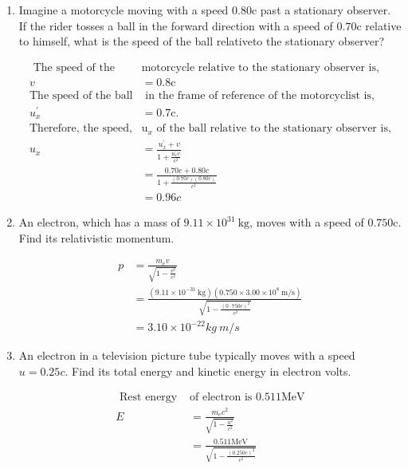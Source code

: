 \begin{enumerate}[ label=\color{ocre}\textbf{\arabic*.}]
	\item Imagine a motorcycle moving with a speed $0.80 \mathrm{c}$ past a stationary observer. If the rider tosses a ball in the forward direction with a speed of $0.70 \mathrm{c}$ relative to himself, what is the speed of the ball relativeto the stationary observer?
	\begin{answer}
		\begin{align*}
		\text{	The speed of the }&\text{motorcycle relative to the stationary observer is,} \\
		v&=0.8 \mathrm{c}\\
		\text{The speed of the ball}&\text{ in the frame of reference of the motorcyclist is,} \\
		 u_{x}^{\prime}&=0.7 \mathrm{c} . \\
		 \text{Therefore, the speed,}&\text{$\mathrm{u}_{x}$ of the ball relative to the stationary observer is,}\\
		u_{x}&=\frac{u_{x}^{\prime}+v}{1+\frac{u_{x}^{\prime} v}{c^{2}}}\\
		&=\frac{0.70 c+0.80 c}{1+\frac{(0.70  c)(0.80 c)}{c^{2}}}\\
		&=0.96 c
		\end{align*}
	\end{answer}
	\item An electron, which has a mass of $9.11 \times 10^{31} \mathrm{~kg}$, moves with a speed of $0.750 \mathrm{c}$. Find its relativistic momentum.
	\begin{answer}
		\begin{align*}
		p&=\frac{m_{e} v}{\sqrt{1-\frac{v^{2}}{c^{2}}}}\\
		&=\frac{\left(9.11 \times 10^{-31} \mathrm{~kg}\right)\left(0.750 \times 3.00 \times 10^{8} \mathrm{~m} / \mathrm{s}\right)}{\sqrt{1-\frac{(0\cdot750c)^{2}}{c^{2}}}}\\&=3.10 \times10^{-22} kg\ m/s
		\end{align*}
	\end{answer}
	\item An electron in a television picture tube typically moves with a speed $u=0.25 c$.  Find its total energy and kinetic energy in electron volts.
	\begin{answer}
		\begin{align*}
		\text{	Rest energy }&\text{of electron is $0.511 \mathrm{MeV}$}\\
		E&=\frac{m_{e} c^{2}}{\sqrt{1-\frac{u^{2}}{c^{2}}}}\\
		&=\frac{0.511 \mathrm{MeV}}{\sqrt{1-\frac{(0.250 c)^{2}}{c^{2}}}}\\

\end{align*}
\end{answer}
\end{enumerate}
